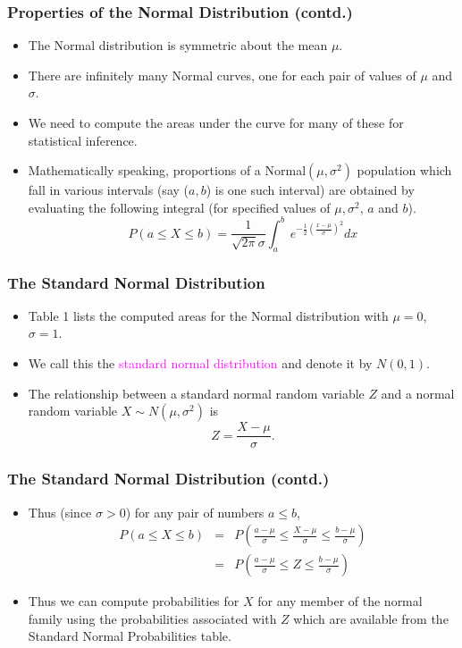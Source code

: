 \documentclass[xcolor=dvipsnames,12pt]{beamer}
\begin{document}
\begin{frame}
\frametitle{Properties of the Normal Distribution (contd.)}
\begin{itemize}
\item The Normal distribution is symmetric about the mean $\mu$.
\item There are infinitely many Normal curves, one for each pair of values
of $\mu$ and $\sigma$.
\item We need to compute the areas under the curve for many of these for
statistical inference.
\item Mathematically speaking, proportions of a Normal$(\mu, \sigma^2)$
population which fall in various intervals (say ($a,b$) is one such
interval) are obtained by evaluating the following integral
(for specified values of $\mu, \sigma^2$, $a$ and $b$).
\begin{equation*}
  P(a \leq X \leq b) = \frac{1}{\sqrt{2\pi}\sigma}
  \int_a^b \, e^{-\frac{1}{2}\left(\frac{x-\mu}{\sigma}\right)^2} dx
\end{equation*}
\end{itemize}
\end{frame}


\begin{frame}
\frametitle{The Standard Normal Distribution}
\begin{itemize}
\item Table 1 lists the computed areas for the Normal distribution with
$\mu = 0$, $\sigma = 1$.  
\item We call this the \textcolor{magenta}{standard normal
distribution} and denote it by $N(0,1)$.\
\item The relationship between a standard normal random variable $Z$
and a normal random variable $X \sim N(\mu, \sigma^2) $ is 
$$Z = \frac{X-\mu}{\sigma}.$$
\end{itemize}
\end{frame}

 
\begin{frame}
\frametitle{The Standard Normal Distribution (contd.)}
\begin{itemize}
\item Thus (since $\sigma > 0$) for any pair of numbers $a \leq b$,
     \begin{eqnarray*}
     P(a \leq X \leq b) & = & P(\frac{a-\mu}{\sigma} \leq
\frac{X-\mu}{\sigma} \leq \frac{b-\mu}{\sigma})\\
           & = & P(\frac{a-\mu}{\sigma} \leq
Z \leq \frac{b-\mu}{\sigma})
     \end{eqnarray*}
\item Thus  we can compute probabilities for $X$  for any
member of the normal family using the probabilities associated
with $Z$ which are available from the Standard Normal Probabilities table.     
\end{itemize}
\end{frame}
\end{document}
